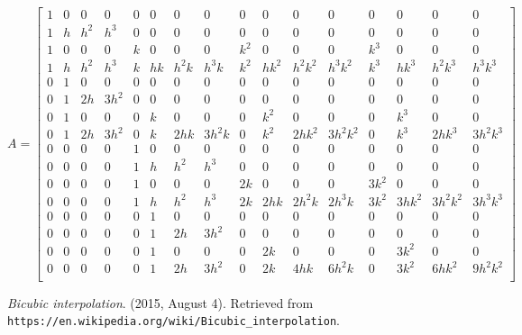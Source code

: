 \documentclass{article}
\begin{document}
\[
A = \begin{bmatrix}
  1 & 0 & 0    & 0     & 0 & 0 & 0 & 0 & 0    & 0 & 0 & 0 & 0    & 0 & 0 & 0 \\
  1 & h & h^2 & h^3 & 0 & 0 & 0 & 0 & 0    & 0 & 0 & 0 & 0    & 0 & 0 & 0 \\
  1 & 0 & 0    & 0     & k & 0 & 0 & 0 & k^2 & 0 & 0 & 0 & k^3 & 0 & 0 & 0 \\
  1 & h & h^2 & h^3 & k & hk & h^2k & h^3k & k^2 & hk^2 & h^2k^2 & h^3k^2 & k^3 & hk^3 & h^2k^3 & h^3k^3 \\
  0 & 1 & 0    & 0     & 0 & 0 & 0 & 0 & 0    & 0 & 0 & 0 & 0    & 0 & 0 & 0 \\
  0 & 1 & 2h & 3h^2 & 0 & 0 & 0 & 0 & 0    & 0 & 0 & 0 & 0    & 0 & 0 & 0 \\
  0 & 1 & 0   & 0      & 0 & k & 0 & 0 & 0    & k^2 & 0 & 0 & 0 & k^3 & 0 & 0 \\
  0 & 1 & 2h & 3h^2 & 0 & k & 2hk & 3h^2k & 0 & k^2 & 2hk^2 & 3h^2k^2 & 0 & k^3 & 2hk^3 & 3h^2k^3 \\
  0 & 0 & 0 & 0 & 1 & 0 & 0 & 0 & 0    & 0 & 0 & 0 & 0    & 0 & 0 & 0 \\
  0 & 0 & 0 & 0 & 1 & h & h^2 & h^3 & 0 & 0 & 0 & 0 & 0 & 0 & 0 & 0 \\
  0 & 0 & 0 & 0 & 1 & 0 & 0 & 0 & 2k & 0 & 0 & 0 & 3k^2 & 0 & 0 & 0 \\
  0 & 0 & 0 & 0 & 1 & h & h^2 & h^3 & 2k & 2hk & 2h^2k & 2h^3k & 3k^2 & 3hk^2 & 3h^2k^2 & 3h^3k^3 \\
  0 & 0 & 0 & 0 & 0 & 1 & 0 & 0 & 0    & 0 & 0 & 0 & 0    & 0 & 0 & 0 \\
  0 & 0 & 0 & 0 & 0 & 1 & 2h & 3h^2 & 0    & 0 & 0 & 0 & 0    & 0 & 0 & 0 \\
  0 & 0 & 0 & 0 & 0 & 1 & 0 & 0 & 0 & 2k & 0 & 0 & 0 & 3k^2 & 0 & 0 \\
  0 & 0 & 0 & 0 & 0 & 1 & 2h & 3h^2 & 0 & 2k & 4hk & 6h^2k & 0 & 3k^2 & 6hk^2 & 9h^2k^2 \\
  \end{bmatrix}
\]

\begin{thebibliography}{9}
   \emph{Bicubic interpolation}. (2015, August
    4). Retrieved from \texttt{https://en.wikipedia.org/wiki/Bicubic\_interpolation}.
\end{thebibliography}
\end{document}
